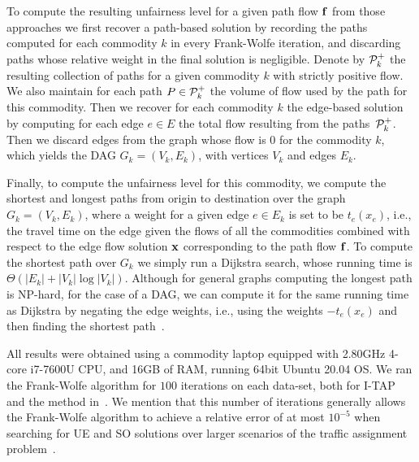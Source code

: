 \documentclass{article}
\begin{document}
To compute the resulting unfairness level for a given path flow $\f$ from those approaches we first recover a path-based solution by recording the paths computed for each commodity $k$ in every Frank-Wolfe iteration, and discarding paths whose relative weight in the final solution is negligible. Denote by $\P^+_k$ the resulting collection of paths for a given commodity $k$ with strictly positive flow. We also maintain for each path $P\in \P^+_k$ the volume of flow used by the path for this commodity. Then we recover for each commodity $k$ the edge-based solution by computing for each edge $e\in E$ the total flow resulting from the paths~$\P^+_k$. Then we discard edges from the graph whose flow is $0$ for the commodity $k$, which yields the DAG $G_k = (V_k,E_k)$, with vertices $V_k$ and edges $E_k$. 

Finally, to compute the unfairness level for this commodity, we compute the shortest and longest paths from origin to destination over the graph $G_k=(V_k,E_k)$, where a weight for a given edge $e\in E_k$ is set to be $t_e(x_e)$, i.e., the travel time on the edge given the flows of all the commodities combined with respect to the edge flow solution $\x$ corresponding to the path flow $\f$. To compute the shortest path over $G_k$ we simply run a Dijkstra search, whose running time is $\Theta(|E_k|+|V_k|\log |V_k|)$. Although for general graphs computing the longest path is NP-hard, for the case of a DAG, we can compute it for the same running time as Dijkstra by negating the edge weights, i.e., using the weights $-t_e(x_e)$ and then finding the shortest path~\cite{dag-book-algos}.

All results %
were obtained using a commodity laptop equipped with 2.80GHz 4-core i7-7600U CPU, and 16GB of RAM, running 64bit Ubuntu 20.04 OS. We ran the Frank-Wolfe algorithm for $100$ iterations on each data-set, both for I-TAP and the method in~\cite{so-routing-seminal}. We mention that %
this number of iterations generally allows the Frank-Wolfe algorithm to achieve a relative error of at most $10^{-5}$ when searching for UE and SO solutions over larger scenarios of the traffic assignment problem~\cite{MitradjievaLindberg13}.
\fi

\end{document}
